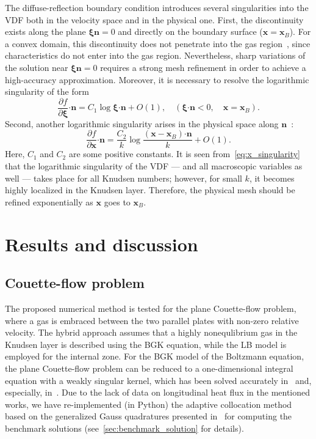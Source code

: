\documentclass{elsarticle} %
\newcommand{\pder}[2][]{\frac{\partial#1}{\partial#2}}
\newcommand{\OO}[1]{O(#1)}
\newcommand{\bxi}{\boldsymbol{\xi}}
\newcommand{\bn}{\boldsymbol{n}}
\newcommand{\bdot}{\boldsymbol{\cdot}}
\newcommand{\bx}{\boldsymbol{x}}
\begin{document}
The diffuse-reflection boundary condition introduces several singularities into the VDF
both in the velocity space and in the physical one.
First, the discontinuity exists along the plane \(\bxi\bn=0\) and directly on the boundary surface (\(\bx=\bx_B\)).
For a convex domain, this discontinuity does not penetrate into the gas region~\cite{Kim2011, Guo2017},
since characteristics do not enter into the gas region.
Nevertheless, sharp variations of the solution near \(\bxi\bn=0\) requires a strong mesh refinement
in order to achieve a high-accuracy approximation.
Moreover, it is necessary to resolve the logarithmic singularity of the form~\cite{Takata2016}
\begin{equation}\label{eq:xi_singularity}
    \pder[f]{\bxi}\bdot\bn = C_1\log\bxi\bdot\bn + \OO{1}, \quad (\bxi\bdot\bn<0, \quad \bx=\bx_B).
\end{equation}
Second, another logarithmic singularity arises in the physical space along \(\bn\)~\cite{Takata2014}:
\begin{equation}\label{eq:x_singularity}
    \pder[f]{\bx}\bdot\bn = \frac{C_2}{k}\log\frac{(\bx-\bx_B)\bdot\bn}{k} + \OO{1}.
\end{equation}
Here, \(C_1\) and \(C_2\) are some positive constants.
It is seen from~\eqref{eq:x_singularity} that the logarithmic singularity of the VDF
--- and all macroscopic variables as well --- takes place for all Knudsen numbers;
however, for small \(k\), it becomes highly localized in the Knudsen layer.
Therefore, the physical mesh should be refined exponentially as \(\bx\) goes to \(\bx_B\).

\section{Results and discussion}\label{sec:results}

\subsection{Couette-flow problem}

The proposed numerical method is tested for the plane Couette-flow problem,
where a gas is embraced between the two parallel plates with non-zero relative velocity.
The hybrid approach assumes that a highly nonequlibrium gas in the Knudsen layer
is described using the BGK equation, while the LB model is employed for the internal zone.
For the BGK model of the Boltzmann equation, the plane Couette-flow problem can be reduced
to a one-dimensional integral equation with a weakly singular kernel,
which has been solved accurately in~\cite{Luo2015} and, especially, in~\cite{Luo2016}.
Due to the lack of data on longitudinal heat flux in the mentioned works, we have re-implemented (in Python)
the adaptive collocation method based on the generalized Gauss quadratures presented in~\cite{Luo2016}
for computing the benchmark solutions (see~\ref{sec:benchmark_solution} for details).
\end{document}
